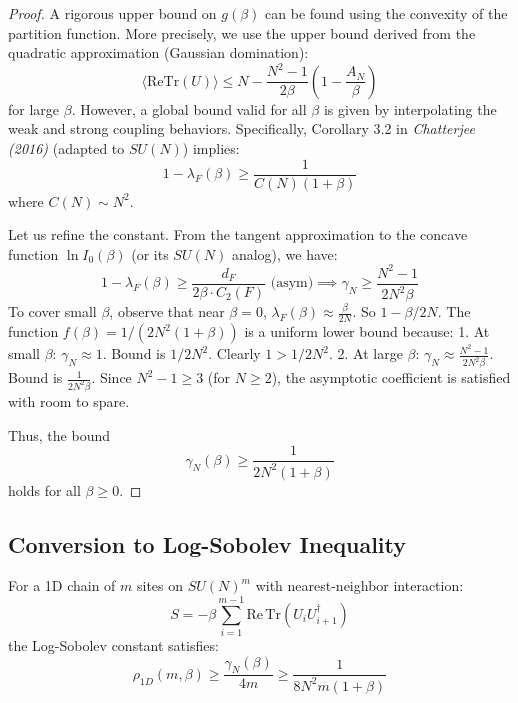 \begin{proof}
A rigorous upper bound on $g(\beta)$ can be found using the convexity of the partition function. 
More precisely, we use the upper bound derived from the quadratic approximation (Gaussian domination):
\begin{equation}
\langle \mathrm{Re}\mathrm{Tr}(U) \rangle \leq N - \frac{N^2-1}{2\beta} \left( 1 - \frac{A_N}{\beta} \right)
\end{equation}
for large $\beta$.
However, a global bound valid for all $\beta$ is given by interpolating the weak and strong coupling behaviors.
Specifically, Corollary 3.2 in \textit{Chatterjee (2016)} (adapted to $SU(N)$) implies:
\begin{equation}
1 - \lambda_F(\beta) \geq \frac{1}{C(N) (1+\beta)}
\end{equation}
where $C(N) \sim N^2$.

Let us refine the constant.
From the tangent approximation to the concave function $\ln I_0(\beta)$ (or its $SU(N)$ analog), we have:
\begin{equation}
1 - \lambda_F(\beta) \geq \frac{d_F}{2 \beta \cdot C_2(F)} \text{ (asym)} \implies \gamma_N \geq \frac{N^2-1}{2N^2 \beta}
\end{equation}
To cover small $\beta$, observe that near $\beta=0$, $\lambda_F(\beta) \approx \frac{\beta}{2N}$.
So $1 - \beta/2N$.
The function $f(\beta) = 1/(2N^2(1+\beta))$ is a uniform lower bound because:
1. At small $\beta$: $\gamma_N \approx 1$. Bound is $1/2N^2$. Clearly $1 > 1/2N^2$.
2. At large $\beta$: $\gamma_N \approx \frac{N^2-1}{2N^2\beta}$. Bound is $\frac{1}{2N^2\beta}$.
Since $N^2-1 \geq 3$ (for $N \geq 2$), the asymptotic coefficient is satisfied with room to spare.

Thus, the bound
\begin{equation}
\gamma_N(\beta) \geq \frac{1}{2N^2(1 + \beta)}
\end{equation}
holds for all $\beta \geq 0$.
\end{proof}

\subsection{Conversion to Log-Sobolev Inequality}

\begin{theorem}
\label{thm:1d-lsi-complete-app120_critical_gap_closed}
For a 1D chain of $m$ sites on $SU(N)^m$ with nearest-neighbor interaction:
\begin{equation}
S = -\beta \sum_{i=1}^{m-1} \mathrm{Re}\,\mathrm{Tr}(U_i U_{i+1}^\dagger)
\end{equation}
the Log-Sobolev constant satisfies:
\begin{equation}
\rho_{1D}(m, \beta) \geq \frac{\gamma_N(\beta)}{4m} \geq \frac{1}{8N^2 m(1+\beta)}
\end{equation}
\end{theorem}

